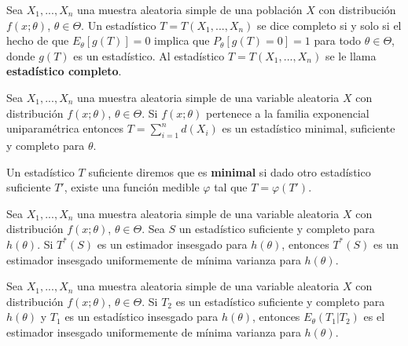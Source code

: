 \begin{defi}
Sea $X_1,...,X_n$ una muestra aleatoria simple de una población $X$ con distribución $f(x;\theta)$, $\theta \in \Theta$. Un estadístico $T = T(X_1,...,X_n)$ se dice completo si y solo si el hecho de que $E_{\theta}[g(T)] = 0$ implica que $P_{\theta}[g(T) = 0] = 1$ para todo $\theta \in \Theta$, donde $g(T)$ es un estadístico.
\newline
Al estadístico $T = T(X_1,...,X_n)$ se le llama \textbf{estadístico completo}.
\end{defi}

\begin{teo}
Sea $X_1,...,X_n$ una muestra aleatoria simple de una variable aleatoria $X$ con distribución $f(x;\theta)$, $\theta \in \Theta$. Si $f(x;\theta)$ pertenece a la familia exponencial uniparamétrica entonces $T = \sum_{i=1}^{n}{d(X_i)}$ es un estadístico minimal, suficiente y completo para $\theta$.
\end{teo}

\begin{defi}
Un estadístico $T$ suficiente diremos que es \textbf{minimal} si dado otro estadístico suficiente $T'$, existe una función medible $\varphi$ tal que $T = \varphi(T')$.
\end{defi}

\begin{teo}
Sea $X_1,...,X_n$ una muestra aleatoria simple de una variable aleatoria $X$ con distribución $f(x;\theta)$, $\theta \in \Theta$. Sea $S$ un estadístico suficiente y completo para $h(\theta)$. Si $T^*(S)$ es un estimador insesgado para $h(\theta)$, entonces $T^*(S)$ es un estimador insesgado uniformemente de mínima varianza para $h(\theta)$.
\end{teo}

\begin{teo}
Sea $X_1,...,X_n$ una muestra aleatoria simple de una variable aleatoria $X$ con distribución $f(x;\theta)$, $\theta \in \Theta$. Si $T_2$ es un estadístico suficiente y completo para $h(\theta)$ y $T_1$ es un estadístico insesgado para $h(\theta)$, entonces $E_{\theta}(T_1 | T_2)$ es el estimador insesgado uniformemente de mínima varianza para $h(\theta)$.
\end{teo}
